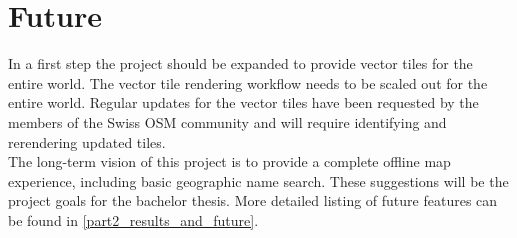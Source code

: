 \section{Future}\label{part1_future}
In a first step the project should be expanded to provide vector tiles for the entire world. The vector tile rendering workflow needs to be scaled out for the entire world. Regular updates for the vector tiles have been requested by the members of the Swiss OSM community
and will require identifying and rerendering updated tiles.\\
The long-term vision of this project is to provide a complete offline map experience, including basic geographic name search. These suggestions will be the project goals for the bachelor thesis. More detailed listing of
future features can be found in \autoref{part2_results_and_future}.
